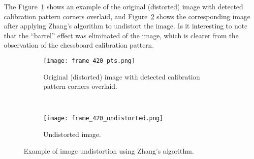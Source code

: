 %


The Figure~\ref{fig:undistort_1} shows an example of the original (distorted) image with detected calibration pattern corners overlaid,
and Figure~\ref{fig:undistort_2} shows the corresponding image after applying Zhang's algorithm to undistort the image.
Is it interesting to note that the ``barrel'' effect was eliminated of the image, which
is clearer from the observation of the chessboard calibration pattern.
%
\begin{figure}[th!]
  \centering
  \begin{subfigure}[t]{.8\linewidth}
    \centering
    \texttt{[image: frame\_420\_pts.png]}
    \caption{Original (distorted) image with detected calibration pattern corners overlaid.}
    \label{fig:undistort_1}
  \end{subfigure}\\
  \begin{subfigure}[t]{0.8\linewidth}
    \centering
    \texttt{[image: frame\_420\_undistorted.png]}
    \caption{Undistorted image.}
    \label{fig:undistort_2}
  \end{subfigure}
  \caption{Example of image undistortion using Zhang's algorithm.}
  \label{fig:undistort}
\end{figure}




